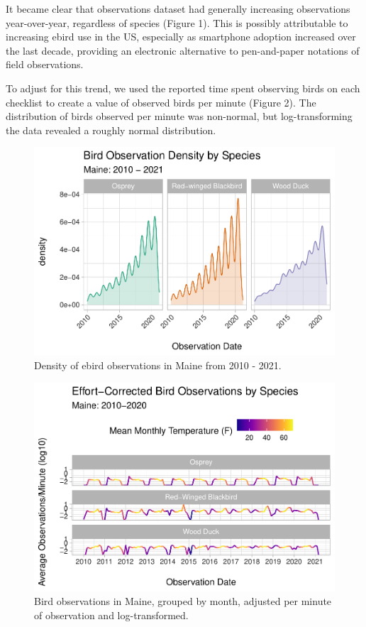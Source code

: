 \documentclass[
  12pt,
]{article}
\begin{document}
It became clear that observations dataset had generally increasing
observations year-over-year, regardless of species (Figure 1). This is
possibly attributable to increasing ebird use in the US, especially as
smartphone adoption increased over the last decade, providing an
electronic alternative to pen-and-paper notations of field observations.

To adjust for this trend, we used the reported time spent observing
birds on each checklist to create a value of observed birds per minute
(Figure 2). The distribution of birds observed per minute was
non-normal, but log-transforming the data revealed a roughly normal
distribution.

\begin{figure}
\centering
\includegraphics{Project_report_ME_files/figure-latex/density.plot-1.pdf}
\caption{Density of ebird observations in Maine from 2010 - 2021.}
\end{figure}

\begin{figure}
\centering
\includegraphics{Project_report_ME_files/figure-latex/monthly.log.effort-1.pdf}
\caption{Bird observations in Maine, grouped by month, adjusted per
minute of observation and log-transformed.}
\end{figure}
\end{document}
